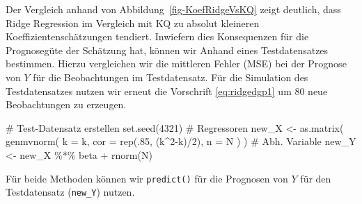 \documentclass[
  a4paper,
  DIV=11,
  oneside]{scrreprt}
\newenvironment{Shaded}{\begin{snugshade}}{\end{snugshade}}
\newcommand{\AttributeTok}[1]{\textcolor[rgb]{0.40,0.45,0.13}{#1}}
\newcommand{\CommentTok}[1]{\textcolor[rgb]{0.37,0.37,0.37}{#1}}
\newcommand{\DecValTok}[1]{\textcolor[rgb]{0.68,0.00,0.00}{#1}}
\newcommand{\FunctionTok}[1]{\textcolor[rgb]{0.28,0.35,0.67}{#1}}
\newcommand{\NormalTok}[1]{\textcolor[rgb]{0.00,0.23,0.31}{#1}}
\newcommand{\OtherTok}[1]{\textcolor[rgb]{0.00,0.23,0.31}{#1}}
\newcommand{\SpecialCharTok}[1]{\textcolor[rgb]{0.37,0.37,0.37}{#1}}
\begin{document}
Der Vergleich anhand von Abbildung~\ref{fig-KoefRidgeVsKQ} zeigt
deutlich, dass Ridge Regression im Vergleich mit KQ zu absolut kleineren
Koeffizientenschätzungen tendiert. Inwiefern dies Konsequenzen für die
Prognosegüte der Schätzung hat, können wir Anhand eines Testdatensatzes
bestimmen. Hierzu vergleichen wir die mittleren Fehler (MSE) bei der
Prognose von \(Y\) für die Beobachtungen im Testdatensatz. Für die
Simulation des Testdatensatzes nutzen wir erneut die Vorschrift
\eqref{eq:ridgedgp1} um 80 neue Beobachtungen zu erzeugen.

\begin{Shaded}
\begin{Highlighting}[]
\CommentTok{\# Test{-}Datensatz erstellen}
\FunctionTok{set.seed}\NormalTok{(}\DecValTok{4321}\NormalTok{)}
\CommentTok{\# Regressoren}
\NormalTok{new\_X }\OtherTok{\textless{}{-}} \FunctionTok{as.matrix}\NormalTok{(}
  \FunctionTok{genmvnorm}\NormalTok{(}
    \AttributeTok{k =}\NormalTok{ k, }
    \AttributeTok{cor =} \FunctionTok{rep}\NormalTok{(.}\DecValTok{85}\NormalTok{, (k}\SpecialCharTok{\^{}}\DecValTok{2}\SpecialCharTok{{-}}\NormalTok{k)}\SpecialCharTok{/}\DecValTok{2}\NormalTok{), }
    \AttributeTok{n =}\NormalTok{ N}
\NormalTok{  )}
\NormalTok{)}
\CommentTok{\# Abh. Variable}
\NormalTok{new\_Y }\OtherTok{\textless{}{-}}\NormalTok{ new\_X }\SpecialCharTok{\%*\%}\NormalTok{ beta }\SpecialCharTok{+} \FunctionTok{rnorm}\NormalTok{(N)}
\end{Highlighting}
\end{Shaded}

Für beide Methoden können wir \texttt{predict()} für die Prognosen von
\(Y\) für den Testdatensatz (\texttt{new\_Y}) nutzen.

\begin{Shaded}
\end{Shaded}
\end{document}
